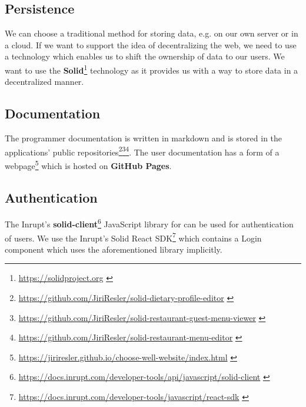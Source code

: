 \subsection*{Persistence}
We can choose a traditional method for storing data, e.g. on our own server or in a cloud.
If we want to support the idea of decentralizing the web, we need to use a technology which enables us to shift the ownership of data to our users.
We want to use the \textbf{Solid}\footnote{\url{https://solidproject.org}  \label{fnlabel}} technology as it provides us with a way to store data in a decentralized manner.

\subsection*{Documentation}
The programmer documentation is written in markdown and is stored in the applications' public repositories\footnote{\url{https://github.com/JiriResler/solid-dietary-profile-editor}  \label{fnlabel}}\footnote{\url{https://github.com/JiriResler/solid-restaurant-guest-menu-viewer}  \label{fnlabel}}\footnote{\url{https://github.com/JiriResler/solid-restaurant-menu-editor}  \label{fnlabel}}.
The user documentation has a form of a webpage\footnote{\url{https://jiriresler.github.io/choose-well-website/index.html}  \label{fnlabel}} which is hosted on \textbf{GitHub Pages}.

\subsection*{Authentication}
The Inrupt's \textbf{solid-client}\footnote{\url{https://docs.inrupt.com/developer-tools/api/javascript/solid-client} \label{fnlabel}} JavaScript library for can be used for authentication of users.
We use the Inrupt's Solid React SDK\footnote{\url{https://docs.inrupt.com/developer-tools/javascript/react-sdk} \label{fnlabel}} which contains a Login component which uses the aforementioned library implicitly.